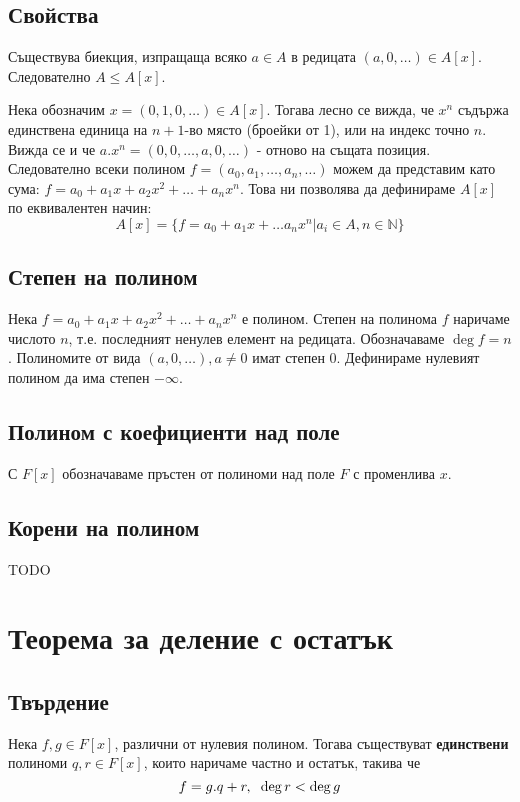 \documentclass[fleqn,12pt]{article}
\begin{document}
\subsection{Свойства}
Съществува биекция, изпращаща всяко $a \in A$ в редицата $(a, 0, \dots) \in A[x]$.
Следователно $A \leq A[x]$.

Нека обозначим $x = (0, 1, 0, \dots) \in A[x]$. Тогава лесно се вижда, че
$x^n$ съдържа единствена единица на $n+1$-во място (броейки от 1), или на индекс точно $n$.
Вижда се и че $a.x^n = (0, 0, \dots, a, 0, \dots)$ - отново на същата позиция.
Следователно всеки полином $f = (a_0, a_1, \dots, a_n, \dots)$ можем да представим като сума:
$f = a_0 + a_1 x + a_2 x^2 + \dots + a_n x^n$.
Това ни позволява да дефинираме $A[x]$ по еквивалентен начин:
\[A[x] = \{ f = a_0 + a_1 x + \dots a_n x^n | a_i \in A, n \in \mathbb{N} \}\]

\subsection{Степен на полином}
Нека $f = a_0 + a_1 x + a_2 x^2 + \dots + a_n x^n$ е полином. Степен на полинома $f$ 
наричаме числото $n$, т.е. последният ненулев елемент на редицата. Обозначаваме $\deg f = n$.
Полиномите от вида $(a, 0, \dots), a \neq 0$ имат степен 0. Дефинираме нулевият полином да има степен $-\infty$.

\subsection{Полином с коефициенти над поле}
С $F[x]$ обозначаваме пръстен от полиноми над поле $F$ с променлива $x$.

\subsection{Корени на полином}
TODO

\section{Теорема за деление с остатък}
\label{sec:division}
\subsection{Твърдение}
Нека $f,g \in F[x]$, различни от нулевия полином. 
Тогава съществуват \textbf{единствени} полиноми $q,r \in F[x]$,
които наричаме частно и остатък, такива че
\[ f = g.q + r, \hspace{2mm} \deg r < \deg g \]
\end{document}
